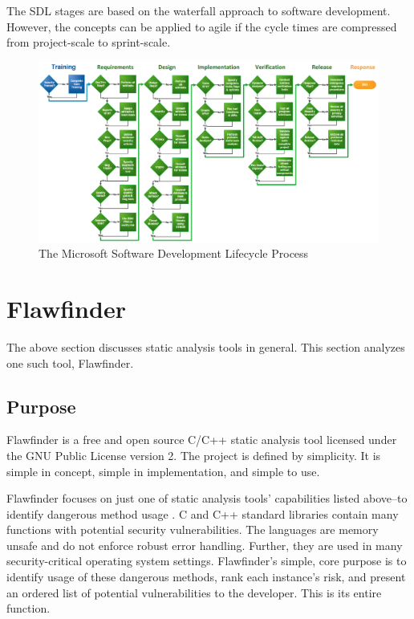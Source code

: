 \documentclass[journal]{IEEEtran}
\begin{document}
The SDL stages are based on the waterfall approach to software development. However, the concepts
can be applied to agile if the cycle times are compressed from project-scale to sprint-scale.

\onecolumn
\begin{landscape}
\begin{figure}
    \includegraphics[width=1.0\linewidth,height=1.0\textheight,keepaspectratio]{images/microsoft_sdl_process.png}
    \captionsetup{justification=centering}
    \caption{The Microsoft Software Development Lifecycle Process \cite{ms_sdl}}
    \label{fig:ms_sdl}
\end{figure}
\end{landscape}
\twocolumn


\section{Flawfinder}

The above section discusses static analysis tools in general. This section analyzes one such tool,
Flawfinder.

\subsection{Purpose}

Flawfinder is a free and open source C/C++ static analysis tool licensed under the GNU Public
License version 2. The project is defined by simplicity. It is simple in concept, simple in
implementation, and simple to use.

Flawfinder focuses on just one of static analysis tools' capabilities listed above--to identify
dangerous method usage \cite{flawfinder}. C and C++ standard libraries contain many functions with
potential security vulnerabilities. The languages are memory unsafe and do not enforce robust error
handling. Further, they are used in many security-critical operating system settings. Flawfinder's
simple, core purpose is to identify usage of these dangerous methods, rank each instance's risk, and
present an ordered list of potential vulnerabilities to the developer. This is its entire function.
\end{document}
